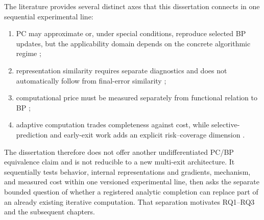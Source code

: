 The literature provides several distinct axes that this dissertation connects in one
sequential experimental line:
\begin{enumerate}
  \item PC may approximate or, under special conditions, reproduce selected BP updates, but the applicability domain depends on the concrete algorithmic regime \cite{whittington2017approximation,song2020exact,salvatori2021convolutional,millidge2022arbitrary,rosenbaum2022relationship,rosenbaum2025correction};
  \item representation similarity requires separate diagnostics and does not automatically follow from final-error similarity \cite{raghu2017svcca,morcos2018insights,kornblith2019similarity};
  \item computational price must be measured separately from functional relation to BP \cite{zahid2023critical};
  \item adaptive computation trades completeness against cost, while selective-prediction and early-exit work adds an explicit risk--coverage dimension \cite{graves2016adaptive,bolukbasi2017adaptive,zniber2025earlyexit,geifman2019selectivenet,jazbec2024riskcontrol,valade2025eero}.
\end{enumerate}

The dissertation therefore does not offer another undifferentiated PC/BP equivalence
claim and is not reducible to a new multi-exit architecture. It sequentially tests
behavior, internal representations and gradients, mechanism, and measured cost within
one versioned experimental line, then asks the separate bounded question of whether a
registered analytic completion can replace part of an already existing iterative
computation. That separation motivates RQ1--RQ3 and the subsequent chapters.
